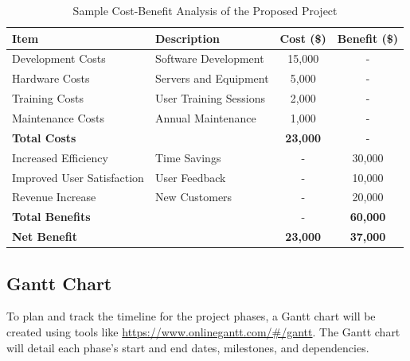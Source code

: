 \begin{table}[h]
    \centering
    \caption{Sample Cost-Benefit Analysis of the Proposed Project}
    \begin{tabular}{@{}llcc@{}}
        \toprule
        \textbf{Item} & \textbf{Description} & \textbf{Cost (\$)} & \textbf{Benefit (\$)} \\ \midrule
        Development Costs & Software Development & 15,000 & - \\
        Hardware Costs & Servers and Equipment & 5,000 & - \\
        Training Costs & User Training Sessions & 2,000 & - \\
        Maintenance Costs & Annual Maintenance & 1,000 & - \\
        \midrule
        \textbf{Total Costs} &  & \textbf{23,000} & - \\ \midrule
        Increased Efficiency & Time Savings & - & 30,000 \\
        Improved User Satisfaction & User Feedback & - & 10,000 \\
        Revenue Increase & New Customers & - & 20,000 \\
        \midrule
        \textbf{Total Benefits} &  & - & \textbf{60,000} \\ \midrule
        \textbf{Net Benefit} &  & \textbf{23,000} & \textbf{37,000} \\ 
        \bottomrule
    \end{tabular}
    \label{tab:cost-benefit}
\end{table}

\subsection{Gantt Chart}
To plan and track the timeline for the project phases, a Gantt chart will be created using tools like \url{https://www.onlinegantt.com/#/gantt}. The Gantt chart will detail each phase's start and end dates, milestones, and dependencies.
